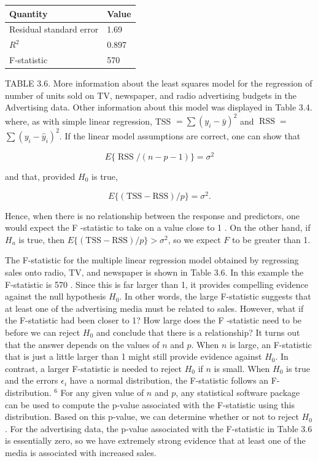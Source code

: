 \documentclass[10pt]{article}
\begin{document}
\begin{center}
\begin{tabular}{l|l}
\hline
Quantity & Value \\
\hline
Residual standard error & 1.69 \\
$R^{2}$ & 0.897 \\
F-statistic & 570 \\
\hline
\end{tabular}
\end{center}

TABLE 3.6. More information about the least squares model for the regression of number of units sold on TV, newspaper, and radio advertising budgets in the Advertising data. Other information about this model was displayed in Table 3.4.\\
where, as with simple linear regression, TSS $=\sum\left(y_{i}-\bar{y}\right)^{2}$ and $\operatorname{RSS}=$ $\sum\left(y_{i}-\hat{y}_{i}\right)^{2}$. If the linear model assumptions are correct, one can show that

$$
E\{\operatorname{RSS} /(n-p-1)\}=\sigma^{2}
$$

and that, provided $H_{0}$ is true,

$$
E\{(\mathrm{TSS}-\mathrm{RSS}) / p\}=\sigma^{2} .
$$

Hence, when there is no relationship between the response and predictors, one would expect the F -statistic to take on a value close to 1 . On the other hand, if $H_{a}$ is true, then $E\{(\mathrm{TSS}-\mathrm{RSS}) / p\}>\sigma^{2}$, so we expect $F$ to be greater than 1.

The F-statistic for the multiple linear regression model obtained by regressing sales onto radio, TV, and newspaper is shown in Table 3.6. In this example the F-statistic is 570 . Since this is far larger than 1, it provides compelling evidence against the null hypothesis $H_{0}$. In other words, the large F-statistic suggests that at least one of the advertising media must be related to sales. However, what if the F-statistic had been closer to 1? How large does the F -statistic need to be before we can reject $H_{0}$ and conclude that there is a relationship? It turns out that the answer depends on the values of $n$ and $p$. When $n$ is large, an F-statistic that is just a little larger than 1 might still provide evidence against $H_{0}$. In contrast, a larger F-statistic is needed to reject $H_{0}$ if $n$ is small. When $H_{0}$ is true and the errors $\epsilon_{i}$ have a normal distribution, the F-statistic follows an F-distribution. ${ }^{6}$ For any given value of $n$ and $p$, any statistical software package can be used to compute the p-value associated with the F-statistic using this distribution. Based on this p-value, we can determine whether or not to reject $H_{0}$. For the advertising data, the p-value associated with the F-statistic in Table 3.6 is essentially zero, so we have extremely strong evidence that at least one of the media is associated with increased sales.
\end{document}
